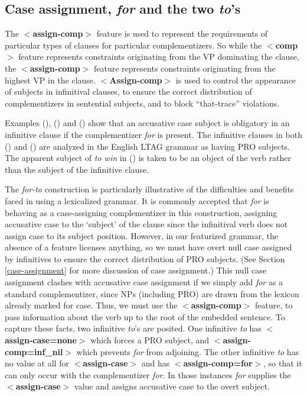\subsection{Case assignment, {\it for\/} and the two {\it to\/}'s}
\label{for-complementizer}

The {\bf $<$assign-comp$>$} feature is used to represent the
requirements of particular types of clauses for particular
complementizers.  So while the {\bf $<$comp$>$} feature represents
constraints originating from the VP dominating the clause, the {\bf
$<$assign-comp$>$} feature represents constraints originating from the
highest VP in the clause. {\bf $<$Assign-comp$>$} is used to control the
appearance of subjects in infinitival clauses,  to
ensure the correct distribution of complementizers in sentential
subjects, and to block ``that-trace'' violations.

Examples (), () and () show that an accusative
case subject is obligatory in an infinitive clause if the
complementizer {\it for\/} is present. The infinitive clauses in both
() and () are analyzed in the English LTAG grammar as
having PRO subjects.  The apparent subject of {\it to win\/} in
() is taken to be an object of the verb rather than the subject
of the infinitive clause. 

 
The {\it for-to\/} construction is particularly illustrative of the
difficulties and benefits faced in using a lexicalized grammar.  It is
commonly accepted that {\it for\/} is behaving as a case-assigning
complementizer in this construction, assigning accusative case to the
`subject' of the clause since the infinitival verb does not assign
case to its subject position.  However, in our featurized grammar, the
absence of a feature licenses anything, so we must have overt null
case assigned by infinitives to ensure the correct distribution of PRO
subjects. (See Section \ref{case-assignment} for more discussion of
case assignment.)  This null case assignment clashes with accusative
case assignment if we simply add {\it for\/} as a standard
complementizer, since NPs (including PRO) are drawn from the lexicon
already marked for case.  Thus, we must use the {\bf
$<$assign-comp$>$} feature, to pass information about the verb up to
the root of the embedded sentence.  To capture these facts, two
infinitive {\it to}'s are posited. One infinitive {\it to\/} has {\bf
$<$assign-case=none$>$} which forces a PRO subject, and {\bf
$<$assign-comp=inf\_nil$>$} which prevents {\it for\/} from
adjoining. The other infinitive {\it to\/} has no value at all for
{\bf $<$assign-case$>$} and has {\bf $<$assign-comp=for$>$}, so that
it can only occur with the complementizer {\it for\/}. In those
instances {\it for} supplies the {\bf $<$assign-case$>$} value and
assigns accusative case to the overt subject.
 
